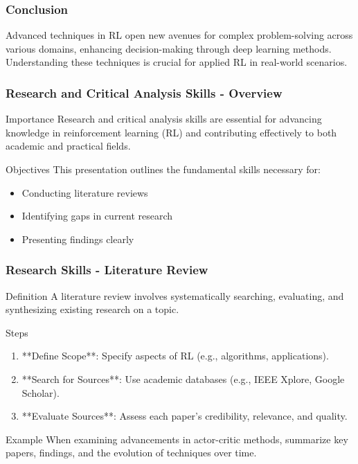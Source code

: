 \documentclass[aspectratio=169]{beamer}
\begin{document}
\begin{frame}[fragile]
    \frametitle{Conclusion}
    Advanced techniques in RL open new avenues for complex problem-solving across various domains, enhancing decision-making through deep learning methods. Understanding these techniques is crucial for applied RL in real-world scenarios.
\end{frame}

\begin{frame}[fragile]
    \frametitle{Research and Critical Analysis Skills - Overview}
    \begin{block}{Importance}
        Research and critical analysis skills are essential for advancing knowledge in reinforcement learning (RL) and contributing effectively to both academic and practical fields.
    \end{block}
    \begin{block}{Objectives}
        This presentation outlines the fundamental skills necessary for:
        \begin{itemize}
            \item Conducting literature reviews
            \item Identifying gaps in current research
            \item Presenting findings clearly
        \end{itemize}
    \end{block}
\end{frame}

\begin{frame}[fragile]
    \frametitle{Research Skills - Literature Review}
    \begin{block}{Definition}
        A literature review involves systematically searching, evaluating, and synthesizing existing research on a topic.
    \end{block}
    \begin{block}{Steps}
        \begin{enumerate}
            \item **Define Scope**: Specify aspects of RL (e.g., algorithms, applications).
            \item **Search for Sources**: Use academic databases (e.g., IEEE Xplore, Google Scholar).
            \item **Evaluate Sources**: Assess each paper's credibility, relevance, and quality.
        \end{enumerate}
    \end{block}
    \begin{block}{Example}
        When examining advancements in actor-critic methods, summarize key papers, findings, and the evolution of techniques over time.
    \end{block}
\end{frame}
\end{document}
